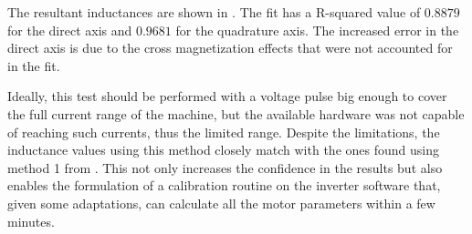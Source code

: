 
The resultant inductances are shown in . The fit has a R-squared value of $0.8879$ for the direct axis and $0.9681$ for the quadrature axis. The increased error in the direct axis is due to the cross magnetization effects that were not accounted for in the fit.

Ideally, this test should be performed with a voltage pulse big enough to cover the full current range of the machine, but the available hardware was not capable of reaching such currents, thus the limited range. Despite the limitations, the inductance values using this method closely match with the ones found using method 1 from . This not only increases the confidence in the results but also enables the formulation of a calibration routine on the inverter software that, given some adaptations, can calculate all the motor parameters within a few minutes.